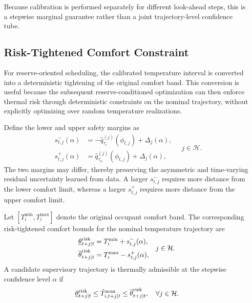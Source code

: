 \documentclass[journal]{IEEEtran}
\theoremstyle{remark}
\begin{document}
	Because calibration is performed separately for different look-ahead steps, this is a stepwise marginal guarantee rather than a joint trajectory-level confidence tube.
	
	\subsection{Risk-Tightened Comfort Constraint}
	
	For reserve-oriented scheduling, the calibrated temperature interval is
	converted into a deterministic tightening of the original comfort band.
	This conversion is useful because the subsequent reserve-conditioned
	optimization can then enforce thermal risk through deterministic
	constraints on the nominal trajectory, without explicitly optimizing
	over random temperature realizations.
	
	Define the lower and upper safety margins as
	\begin{equation}
		\begin{aligned}
			s^-_{t,j}(\alpha)
			&=
			-\hat q_{\tau_l}^{(j)}(\phi_{t,j})
			+
			\Delta_j(\alpha),\\
			s^+_{t,j}(\alpha)
			&=
			\hat q_{\tau_u}^{(j)}(\phi_{t,j})
			+
			\Delta_j(\alpha),
		\end{aligned}
		\quad j\in\mathcal H .
		\label{eq:safety_margins}
	\end{equation}
	The two margins may differ, thereby preserving the asymmetric and
	time-varying residual uncertainty learned from data. A larger
	\(s^-_{t,j}\) requires more distance from the lower comfort limit,
	whereas a larger \(s^+_{t,j}\) requires more distance from the upper
	comfort limit.
	
	Let \([T_i^{\min},T_i^{\max}]\) denote the original occupant comfort
	band. The corresponding risk-tightened comfort bounds for the nominal
	temperature trajectory are
	\begin{equation}
		\begin{aligned}
			\underline{\theta}^{\rm risk}_{t+j|t}
			&=
			T_i^{\min}
			+
			s^-_{t,j}(\alpha),\\
			\overline{\theta}^{\rm risk}_{t+j|t}
			&=
			T_i^{\max}
			-
			s^+_{t,j}(\alpha),
		\end{aligned}
		\quad j\in\mathcal H .
		\label{eq:risk_bounds}
	\end{equation}
	A candidate supervisory trajectory is thermally admissible at the
	stepwise confidence level \(\alpha\) if
	\begin{equation}
		\underline{\theta}^{\rm risk}_{t+j|t}
		\le
		\hat T^{\rm nom}_{i,t+j|t}
		\le
		\overline{\theta}^{\rm risk}_{t+j|t},
		\quad \forall j\in\mathcal H .
		\label{eq:risk_tightened_constraint}
	\end{equation}
	
\end{document}
